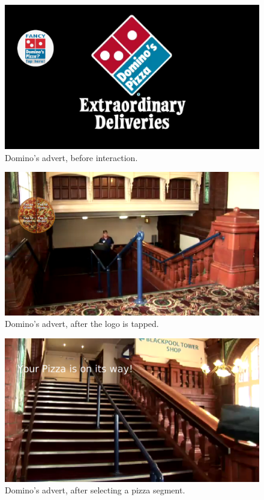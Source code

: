 	\begin{figure}[th]
		\centering
		\includegraphics[width=\textwidth,height=0.5\textheight,keepaspectratio]{images/adverts/dominos-1.png}
		\caption{Domino's advert, before interaction.}
		\label{fig:Dominos1}
	\end{figure}

	\begin{figure}[th]
		\centering
		\includegraphics[width=\textwidth,height=0.5\textheight,keepaspectratio]{images/adverts/dominos-2.png}
		\caption{Domino's advert, after the logo is tapped.}
		\label{fig:Dominos2}
	\end{figure}

	\begin{figure}[th]
		\centering
		\includegraphics[width=\textwidth,height=0.5\textheight,keepaspectratio]{images/adverts/dominos-3.png}
		\caption{Domino's advert, after selecting a pizza segment.}
		\label{fig:Dominos3}
	\end{figure}
	

